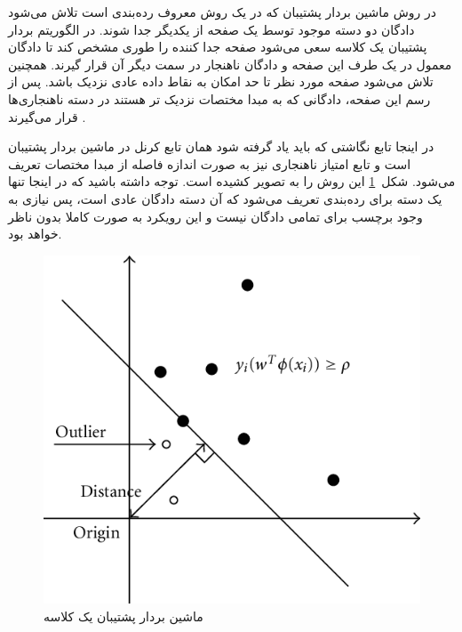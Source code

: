 \documentclass[12pt,a4paper]{report}
\begin{document}
در روش ماشین بردار پشتیبان که در یک روش معروف رده‌بندی است تلاش می‌شود دادگان دو دسته موجود توسط یک صفحه از یکدیگر جدا شوند. در الگوریتم بردار پشتیبان یک کلاسه سعی می‌شود صفحه جدا کننده را طوری مشخص کند تا دادگان معمول در یک طرف این صفحه و دادگان ناهنجار در سمت دیگر آن قرار گیرند. همچنین تلاش می‌شود صفحه مورد نظر تا حد امکان به نقاط داده عادی نزدیک باشد. پس از رسم این صفحه، دادگانی که به مبدا مختصات نزدیک تر هستند در دسته ناهنجاری‌ها قرار می‌گیرند \cite{10.5555/3009657.3009740}.

در اینجا تابع نگاشتی که باید یاد گرفته شود همان تابع کرنل در ماشین بردار پشتیبان است و تابع امتیاز ناهنجاری نیز به صورت اندازه فاصله از مبدا مختصات تعریف می‌شود. شکل~\ref{fig:one-class-svm} این روش را به تصویر کشیده است. توجه داشته باشید که در اینجا تنها یک دسته برای رده‌بندی تعریف می‌شود که آن دسته دادگان عادی است، پس نیازی به وجود برچسب برای تمامی دادگان نیست و این رویکرد به صورت کاملا بدون ناظر خواهد بود.
\begin{figure}[!h]
	\begin{center}
		\includegraphics[width=0.5\linewidth]{./images/figures/one-class-svm.png}
	\end{center}
	\caption{ماشین بردار پشتیبان یک کلاسه}
	\label{fig:one-class-svm}
	\centering
\end{figure}
\end{document}
